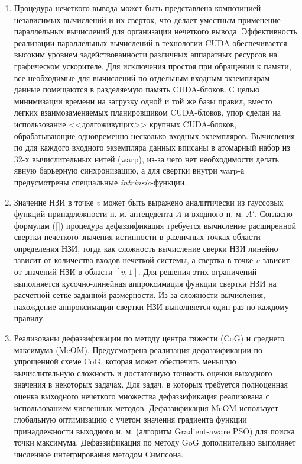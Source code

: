 \begin{enumerate}
	\item Процедура нечеткого вывода может быть представлена композицией независимых вычислений и их сверток, что делает уместным применение параллельных вычислений для организации нечеткого вывода. Эффективность реализации параллельных вычислений в технологии CUDA обеспечивается высоким уровнем задействованности различных аппаратных ресурсов на графическом ускорителе. Для исключения простоя при обращении к памяти, все необходимые для вычислений по отдельным входным экземплярам данные помещаются в разделяемую память CUDA-блоков. С целью минимизации времени на загрузку одной и той же базы правил, вместо легких взаимозаменяемых планировщиком CUDA-блоков, упор сделан на использование <<долгоживущих>> крупных CUDA-блоков, обрабатывающие одновременно несколько входных экземпляров. Вычисления по для каждого входного экземпляра данных вписаны в атомарный набор из 32-х вычислительных нитей (warp), из-за чего нет необходимости делать явную барьерную синхронизацию, а для свертки внутри warp-а предусмотрены специальные \textit{intrinsic}-функции.
	\item Значение НЗИ в точке $v$ может быть выражено аналитически из гауссовых функций принадлежности н. м. антецедента $A$ и входного н. м. $A'$. Согласно формулам (\ref{}) процедура дефаззификация требуется вычисление расширенной свертки нечеткого значения истинности в различных точках области определения НЗИ, тогда как сложность вычисление сверки НЗИ линейно зависит от количества входов нечеткой системы, а свертка в точке $v$ зависит от значений НЗИ в области $[v, 1]$. Для решения этих ограничений выполняется кусочно-линейная аппроксимация функции свертки НЗИ на расчетной сетке заданной размерности. Из-за сложности вычисления, нахождение аппроксимации свертки НЗИ выполняется один раз по каждому правилу. 
	\item Реализованы дефаззификации по методу центра тяжести (CoG) и среднего максимума (MeOM). Предусмотрена реализация дефаззификации по упрощенной схеме CoG, которая может обеспечить меньшую вычислительную сложность и достаточную точность оценки выходного значения в некоторых задачах. Для задач, в которых требуется полноценная оценка выходного нечеткого множества дефаззификация реализована с использованием численных методов. Дефаззификация MeOM использует глобальную оптимизацию с учетом значения градиента функции принадлежности выходного н. м. (алгоритм Gradient-aware PSO) для поиска точки максимума. Дефаззификация по методу GoG дополнительно выполняет численное интегрирования методом Симпсона.

\end{enumerate}
